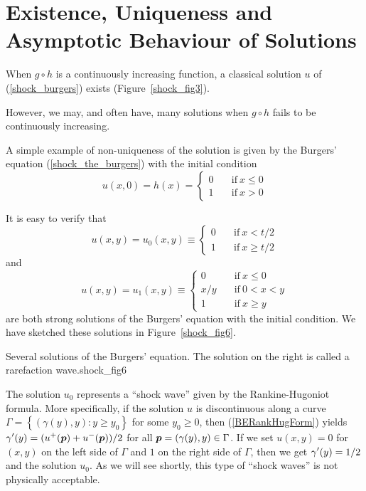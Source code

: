 \section{Existence, Uniqueness and Asymptotic Behaviour of Solutions}

When $g \circ h$ is a continuously increasing function, a classical
solution $u$ of (\ref{shock_burgers}) exists (Figure~\ref{shock_fig3}).


However, we may, and often have, many solutions when
$g \circ h$ fails to be continuously increasing.

\begin{egg}
A simple example of non-uniqueness of the solution is given by the
\label{egg_burgers_nu}
Burgers' equation (\ref{shock_the_burgers}) with the initial condition
\[
u(x,0) = h(x) = \begin{cases}
0 & \quad \text{if}\ x \leq 0 \\
1 & \quad \text{if}\ x > 0
\end{cases}
\]

It is easy to verify that
\[
u(x,y) = u_0(x,y) \equiv \begin{cases} 0 & \quad \text{if} \ x < t/2 \\
1 & \quad \text{if} \ x \geq t/2
\end{cases}
\]
and
\[
u(x,y) = u_1(x,y) \equiv \begin{cases} 0 & \quad \text{if} \ x \leq 0 \\
x/y & \quad \text{if} \ 0 < x < y \\
1 & \quad \text{if} \ x \geq y  
\end{cases}
\]
are both strong solutions of the Burgers' equation with the initial condition.
We have sketched these solutions in Figure~\ref{shock_fig6}.

{Several solutions of the Burgers' equation.  The solution on the
right is called a rarefaction wave.}{shock_fig6}

The solution $u_0$ represents a ``shock wave'' given by the
Rankine-Hugoniot formula.
More specifically, if the solution $u$ is discontinuous along a curve
$\Gamma = \left\{ (\gamma(y),y) : y \geq y_0 \right\}$ for some
$y_0 \geq 0$, then (\ref{BERankHugForm}) yields
$\displaystyle \gamma'(y) = (u^+({\bm{p}})+u^-({\bm{p}}))/2$
for all ${\bm{p}}=(\gamma(y),y) \in \Gamma$.  If we set $u(x,y) = 0$
for $(x,y)$ on the left side of $\Gamma$ and $1$ on the right side
of $\Gamma$, then we get $\displaystyle \gamma'(y) = 1/2$ and the solution
$u_0$.  As we will see shortly, this type of ``shock waves'' is not
physically acceptable.


\end{egg}
